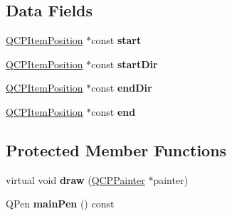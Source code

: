 \subsection*{Data Fields}
\begin{DoxyCompactItemize}
\item 
\hypertarget{classQCPItemCurve_a20c3b5ea31c33764f4f30c2ec7ae518b}{\hyperlink{classQCPItemPosition}{Q\-C\-P\-Item\-Position} $\ast$const {\bfseries start}}\label{classQCPItemCurve_a20c3b5ea31c33764f4f30c2ec7ae518b}

\item 
\hypertarget{classQCPItemCurve_aa124bf66c09cc51c627fb49db8bf8a7b}{\hyperlink{classQCPItemPosition}{Q\-C\-P\-Item\-Position} $\ast$const {\bfseries start\-Dir}}\label{classQCPItemCurve_aa124bf66c09cc51c627fb49db8bf8a7b}

\item 
\hypertarget{classQCPItemCurve_a28181a9dee9cc3c3da83a883221bd2d0}{\hyperlink{classQCPItemPosition}{Q\-C\-P\-Item\-Position} $\ast$const {\bfseries end\-Dir}}\label{classQCPItemCurve_a28181a9dee9cc3c3da83a883221bd2d0}

\item 
\hypertarget{classQCPItemCurve_a24ecbb195b32a08b42b61c2cf08a1b4d}{\hyperlink{classQCPItemPosition}{Q\-C\-P\-Item\-Position} $\ast$const {\bfseries end}}\label{classQCPItemCurve_a24ecbb195b32a08b42b61c2cf08a1b4d}

\end{DoxyCompactItemize}
\subsection*{Protected Member Functions}
\begin{DoxyCompactItemize}
\item 
\hypertarget{classQCPItemCurve_a56cb5b72cd02db2eda598274a39839a9}{virtual void {\bfseries draw} (\hyperlink{classQCPPainter}{Q\-C\-P\-Painter} $\ast$painter)}\label{classQCPItemCurve_a56cb5b72cd02db2eda598274a39839a9}

\item 
\hypertarget{classQCPItemCurve_a8089126f5645b6edfbaddea49d1e8390}{Q\-Pen {\bfseries main\-Pen} () const }\label{classQCPItemCurve_a8089126f5645b6edfbaddea49d1e8390}

\end{DoxyCompactItemize}
